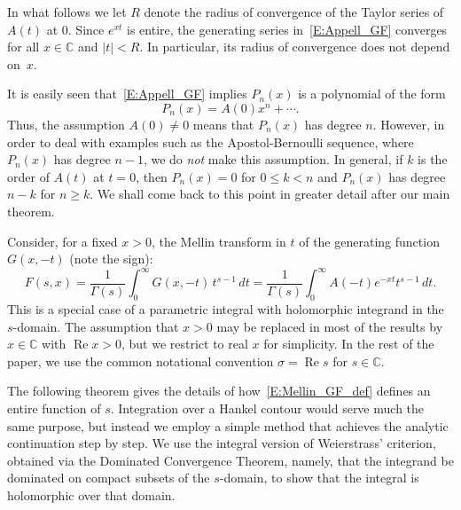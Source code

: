 \documentclass[11pt,a4paper]{amsart}
\newcommand{\C}{\mathbb{C}}
\renewcommand{\Re}{\operatorname{Re}}
\renewcommand{\Im}{\operatorname{Im}}
\theoremstyle{plain}
\theoremstyle{plain}
\theoremstyle{definition}
\theoremstyle{remark}
\begin{document}
In what follows we let $R$ denote the radius of convergence of the Taylor series of $A(t)$ at $0$. Since $e^{xt}$ is entire, the generating series in~\eqref{E:Appell_GF} converges for all $x \in \C$ and $|t| < R$. In particular, its radius of convergence does not depend on~$x$.


It is easily seen that~\eqref{E:Appell_GF} implies $P_{n}(x)$ is a polynomial of the form
%
\begin{equation*}
  P_{n}(x)=A(0)x^n+\cdots.
\end{equation*}
%
Thus, the assumption $A(0) \neq 0$ means that $P_{n}(x)$ has degree $n$. However, in order to deal with examples such as the Apostol-Bernoulli sequence, where $P_{n}(x)$ has degree $n-1$, we do \emph{not} make this assumption. In general, if $k$ is the order of $A(t)$ at $t=0$, then $P_{n}(x) = 0$ for $0 \leq k < n$ and $P_{n}(x)$ has degree $n-k$ for $n \geq k$. We shall come back to this point in greater detail after our main theorem.


Consider, for a fixed $x > 0$, the Mellin transform in $t$ of the generating function $G(x,-t)$ (note the sign):
\begin{equation}
\label{E:Mellin_GF_def}
    F(s,x) = \frac{1}{\Gamma(s)}\int_{0}^{\infty} G(x,-t)\,t^{s-1}\,dt 
	       = \frac{1}{\Gamma(s)} \int_{0}^{\infty} A(-t) e^{-xt} t^{s-1}\,dt.
\end{equation}
This is a special case of a parametric integral with holomorphic integrand in the $s$-domain. The assumption that $x > 0$ may be replaced in most of the results by $x \in \C$ with $\Re x > 0$, but we restrict to real $x$ for simplicity. In the rest of the paper, we use the common notational convention $\sigma = \Re s$ for $s \in \C$.

The following theorem gives the details of how~\eqref{E:Mellin_GF_def} defines an entire function of $s$. Integration over a Hankel contour would serve much the same purpose, but instead we employ a simple method that achieves the analytic continuation step by step. We use the integral version of Weierstrass' criterion, obtained via the Dominated Convergence Theorem, namely, that the integrand be dominated on compact subsets of the $s$-domain, to show that the integral is holomorphic over that domain.
\end{document}

